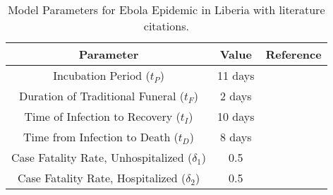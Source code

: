 \begin{table}[ht]
\centering %
\begin{tabular}{c c c}
\hline\hline %
Parameter & Value  & Reference \\ [0.5ex]
\hline %
Incubation Period (${t_{P}}$) & 11 days & \cite{WHOFacts} \\
Duration of Traditional Funeral (${t_{F}}$) & 2 days & \cite{Rivers2014} \\
Time of Infection to Recovery (${t_{I}}$) & 10 days & \cite{Rivers2014} \\
Time from Infection to Death (${t_{D}}$) & 8 days & \cite{Rivers2014} \\
Case Fatality Rate, Unhospitalized ($\delta_{1}$) & 0.5 & \cite{WHOFacts} \\
Case Fatality Rate, Hospitalized ($\delta_{2}$) & 0.5 & \cite{WHOFacts} \\ [1ex]
\hline
\end{tabular}
\caption{Model Parameters for Ebola Epidemic in Liberia with literature citations.} %
\label{tab:knownParameters}
\end{table}

